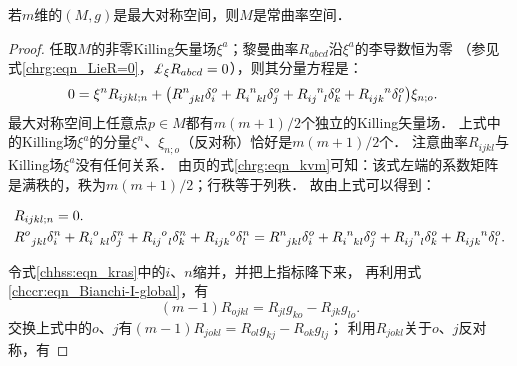 \begin{proposition}
    若$m$维的$(M,g)$是最大对称空间，则$M$是常曲率空间．
\end{proposition}
\begin{proof}
    任取$M$的非零Killing矢量场$\xi^a$；黎曼曲率$R_{abcd}$沿$\xi^a$的李导数恒为零
    （参见式\eqref{chrg:eqn_LieR=0}，$\Lie_{\xi} R_{abcd} =0$），则其分量方程是：
    \begin{align}
        0&=   \xi^n R_{ijkl;n}
        + \bigl(R^n_{\hphantom{n}jkl} \delta_i^o 
        + R_{i\hphantom{n}kl}^{\hphantom{i}n} \delta_j^o 
        + R_{ij\hphantom{n}l}^{\hphantom{ij}n} \delta_k^o 
        + R_{ijk}^{\hphantom{ijk}n} \delta_l^o 
        \bigr) \xi_{n;o} .
    \end{align}
    最大对称空间上任意点$p\in M$都有$m(m+1)/2$个独立的Killing矢量场．
    上式中的Killing场$\xi^a$的分量$\xi^n$、$\xi_{n;o}$（反对称）恰好是$m(m+1)/2$个．
    注意曲率$R_{ijkl}$与Killing场$\xi^a$没有任何关系．
    由\pageref{chrg:eqn_kvm}页的式\eqref{chrg:eqn_kvm}可知：该式左端的系数矩阵
    是满秩的，秩为$m(m+1)/2$；行秩等于列秩．    故由上式可以得到：
    \begin{small}
    \setlength{\mathindent}{0em}
    \begin{align}
        &R_{ijkl;n}=0 .  \label{chhss:eqn_DR=0} \\
        & R^o_{\hphantom{n}jkl} \delta_i^n 
        + R_{i\hphantom{n}kl}^{\hphantom{i}o} \delta_j^n 
        + R_{ij\hphantom{n}l}^{\hphantom{ij}o} \delta_k^n
        + R_{ijk}^{\hphantom{ijk}o} \delta_l^n
        = R^n_{\hphantom{n}jkl} \delta_i^o 
        + R_{i\hphantom{n}kl}^{\hphantom{i}n} \delta_j^o 
        + R_{ij\hphantom{n}l}^{\hphantom{ij}n} \delta_k^o 
        + R_{ijk}^{\hphantom{ijk}n} \delta_l^o . \label{chhss:eqn_kras}
    \end{align} \setlength{\mathindent}{2em}
    \end{small}
    令式\eqref{chhss:eqn_kras}中的$i$、$n$缩并，并把上指标降下来，
    再利用式\eqref{chccr:eqn_Bianchi-I-global}，有
    \begin{equation}\label{chhss:eqn_Rojkl}
        (m-1)R_{ojkl} = R_{jl} g_{ko}   - R_{jk} g_{lo} .
    \end{equation}
    交换上式中的$o$、$j$有$(m-1)R_{jokl} = R_{ol} g_{kj}   - R_{ok} g_{lj} $；
    利用$R_{jokl}$关于$o$、$j$反对称，有

\end{proof}
